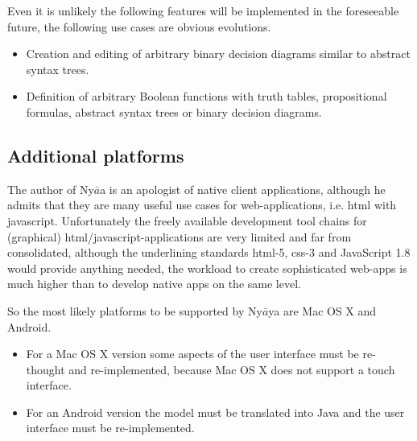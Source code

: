 Even it is unlikely the following features will be implemented in the foreseeable future, 
the following use cases are obvious evolutions.

\begin{itemize}

\item Creation and editing of arbitrary binary decision diagrams similar to abstract syntax trees.

\item Definition of arbitrary Boolean functions with truth tables, propositional formulas, abstract syntax trees or binary decision diagrams.

\end{itemize}


\subsection{Additional platforms}

The author of Ny$\bar{a}$a is an apologist of native client applications,
although he admits that they are many useful use cases for web-applications, 
i.e. html with javascript. 
Unfortunately the freely available development tool chains for (graphical) html/javascript-applications
are very limited and far from consolidated, although the underlining standards html-5, css-3 
and JavaScript 1.8 would provide anything needed, the workload to create sophisticated web-apps 
is much higher than to develop native apps on the same level.

So the most likely platforms to be supported by Ny$\bar{a}$ya are Mac OS X and Android.

\begin{itemize}
\item
For a Mac OS X version some aspects of the user interface must be re-thought and re-implemented, 
because Mac OS X does not support a touch interface.
\item
For an Android version the model must be translated into Java and the user interface must be re-implemented.
\end{itemize}

